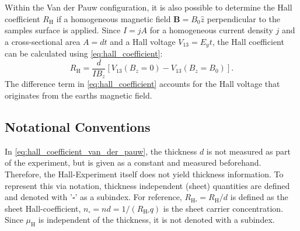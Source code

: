 Within the Van der Pauw configuration, it is also possible to determine the Hall 
coefficient $R_{\mathrm{H}}$ if a homogeneous magnetic field 
$\mathbf{B}=B_{0} \hat{z}$ perpendicular to the samples surface is applied. 
Since $I= j A$ for a homogeneous current density $j$ and a cross-sectional area 
$A = d t$ and a Hall voltage $V_{13} = E_{y} t$,
the Hall coefficient can be calculated using \cref{eq:hall_coefficient}:
\begin{equation}
	R_{\mathrm{H}}=\frac{d}{IB_{z}} [V_{13}(B_{z}=0)-V_{13}(B_{z}=B_{0})].
	\label{eq:hall_coefficient_van_der_pauw}
\end{equation}
The difference term in  \cref{eq:hall_coefficient} accounts for the Hall voltage that 
originates from the earths magnetic field.

\subsection{Notational Conventions}
In \cref{eq:hall_coefficient_van_der_pauw}, the thickness $d$ is
not measured as part of the experiment, but is given as a constant and measured
beforehand. 
Therefore, the Hall-Experiment itself does not yield thickness information.
To represent this via notation, thickness independent (sheet) quantities are defined and 
denoted with '$\square$' as a subindex.
For reference, $R_{\mathrm{H} \square}=R_\mathrm{H} / d$ is defined as the sheet 
Hall-coefficient, $n_\square = n d = 1 / (R_\mathrm{H \square}q)$ is the sheet carrier 
concentration. 
Since $\mu_\mathrm{H}$ is independent of the thickness, 
it is not denoted with a subindex.

